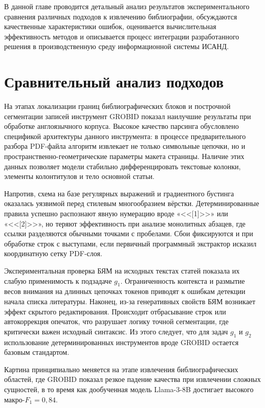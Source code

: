 В данной главе проводится детальный анализ результатов экспериментального сравнения различных подходов к извлечению библиографии, обсуждаются качественные характеристики ошибок, оценивается вычислительная эффективность методов и описывается процесс интеграции разработанного решения в производственную среду информационной системы ИСАНД.

\section{Сравнительный анализ подходов}
На этапах локализации границ библиографических блоков и построчной сегментации записей инструмент GROBID показал наилучшие результаты при обработке англоязычного корпуса. Высокое качество парсинга обусловлено спецификой архитектуры данного инструмента: в процессе предварительного разбора PDF-файла алгоритм извлекает не только символьные цепочки, но и пространственно-геометрические параметры макета страницы. Наличие этих данных позволяет модели стабильно дифференцировать текстовые колонки, элементы колонтитулов и тело основной статьи.

Напротив, схема на базе регулярных выражений и градиентного бустинга оказалась уязвимой перед стилевым многообразием вёрстки. Детерминированные правила успешно распознают явную нумерацию вроде «<<[1]>>» или «<<[2]>>», но теряют эффективность при анализе монолитных абзацев, где ссылки разделяются обычными точками с пробелами. Сбои фиксируются и при обработке строк с выступами, если первичный программный экстрактор исказил координатную сетку PDF-слоя.

Экспериментальная проверка БЯМ на исходных текстах статей показала их слабую применимость к подзадаче $g_1$. Ограниченность контекста и размытие весов внимания на длинных цепочках токенов приводят к ошибкам детекции начала списка литературы. Наконец, из-за генеративных свойств БЯМ возникает эффект скрытого редактирования. Происходит отбрасывание строк или автокоррекция опечаток, что разрушает логику точной сегментации, где критически важен исходный синтаксис. Из этого следует, что для задач $g_1$ и $g_2$ использование детерминированных инструментов вроде GROBID остается базовым стандартом.

Картина принципиально меняется на этапе извлечения библиографических областей, где GROBID показал резкое падение качества при извлечении сложных сущностей, в то время как дообученная модель Llama-3-8B достигает высокого макро-$F_1 = 0,84$.

